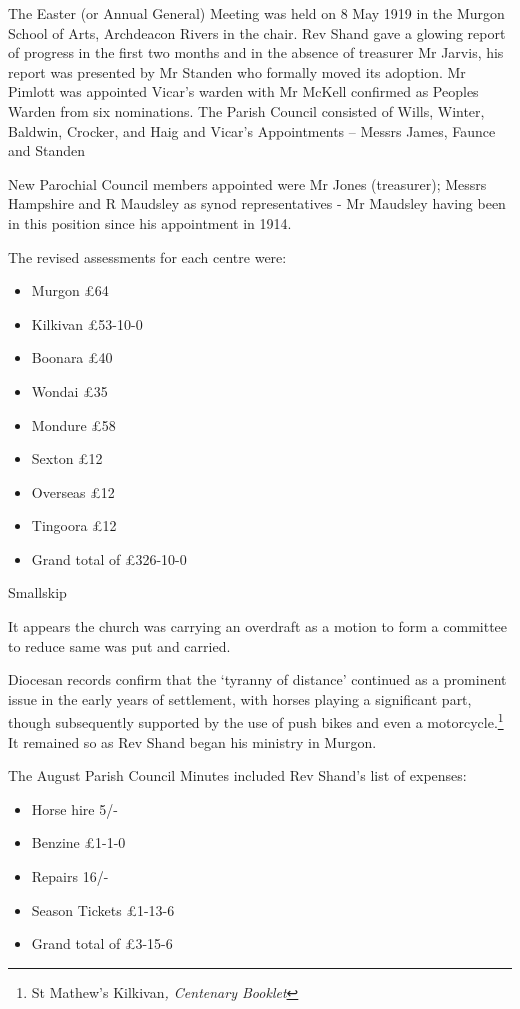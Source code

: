 The Easter (or Annual General) Meeting was held on 8 May 1919 in the Murgon School of Arts, Archdeacon Rivers in the chair. Rev Shand gave a glowing report of progress in the first two months and in the absence of treasurer Mr Jarvis, his report was presented by Mr Standen who formally moved its adoption. Mr Pimlott was appointed Vicar's warden with Mr McKell confirmed as Peoples Warden from six nominations. The Parish Council consisted of Wills, Winter, Baldwin, Crocker, and Haig and Vicar's Appointments -- Messrs James, Faunce and Standen

New Parochial Council members appointed were Mr Jones (treasurer); Messrs Hampshire and R Maudsley as synod representatives - Mr Maudsley having been in this position since his appointment in 1914.

The revised assessments for each centre were:

\begin{itemize}
\item
  Murgon £64
\item
  Kilkivan £53-10-0
\item
  Boonara £40
\item
  Wondai £35
\item
  Mondure £58
\item
  Sexton £12
\item
  Overseas £12
\item
  Tingoora £12
\item
  Grand total of £326-10-0
\end{itemize}

Smallskip

It appears the church was carrying an overdraft as a motion to form a committee to reduce same was put and carried.

Diocesan records confirm that the `tyranny of distance' continued as a prominent issue in the early years of settlement, with horses playing a significant part, though subsequently supported by the use of push bikes and even a motorcycle.\footnote{St Mathew's Kilkivan\emph{, Centenary Booklet}} It remained so as Rev Shand began his ministry in Murgon.

The August Parish Council Minutes included Rev Shand's list of expenses:

\begin{itemize}
\item
  Horse hire 5/-
\item
  Benzine £1-1-0
\item
  Repairs 16/-
\item
  Season Tickets £1-13-6
\item
  Grand total of £3-15-6
\end{itemize}


